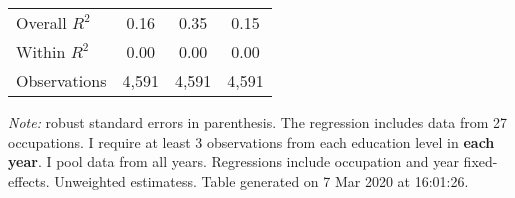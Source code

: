 \begin{center}
\begin{threeparttable}[!h]
\begin{tabular}{lccc}
\midrule Overall $ R^2$&        0.16         &        0.35         &        0.15         \\
Within $ R^2$       &        0.00         &        0.00         &        0.00         \\
Observations        &       4,591         &       4,591         &       4,591         \\
\bottomrule
\bottomrule
\end{tabular}
\begin{tablenotes}
\item\footnotesize\textit{Note:} robust standard errors in parenthesis. The regression includes data from 27 occupations. I require at least 3 observations from each education level in \textbf{each year}. I pool data from all years. Regressions include occupation and year fixed-effects. Unweighted estimatess. Table generated on  7 Mar 2020 at 16:01:26.
\end{tablenotes}
\end{threeparttable}
\end{center}
